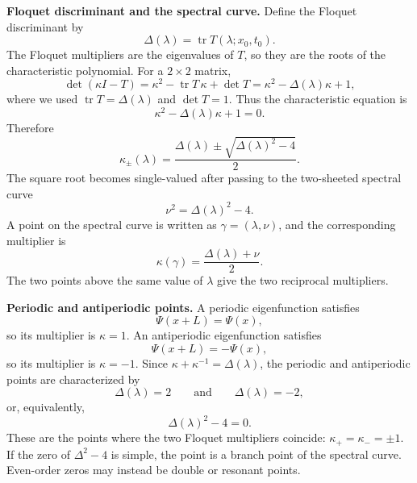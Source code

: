 \documentclass{amsart}
\newcounter{note}
\numberwithin{equation}{hw}
\newcommand{\noteheading}[1]{\vspace{1em}\noindent\textbf{#1}}
\begin{document}
\noteheading{Floquet discriminant and the spectral curve.}
Define the Floquet discriminant by
\begin{equation}
\Delta(\lambda)=\operatorname{tr}T(\lambda;x_0,t_0).
\label{eq:note2-floquet-discriminant}
\end{equation}
The Floquet multipliers are the eigenvalues of \(T\), so they are the
roots of the characteristic polynomial.  For a \(2\times2\) matrix,
\[
\det(\kappa I-T)
=
\kappa^2-\operatorname{tr}T\,\kappa+\det T
=
\kappa^2-\Delta(\lambda)\kappa+1,
\]
where we used \(\operatorname{tr}T=\Delta(\lambda)\) and \(\det T=1\).
Thus the characteristic equation is
\begin{equation}
\kappa^2-\Delta(\lambda)\kappa+1=0.
\label{eq:note2-characteristic-equation}
\end{equation}
Therefore
\begin{equation}
\kappa_\pm(\lambda)
=
\frac{
\Delta(\lambda)
\pm
\sqrt{\Delta(\lambda)^2-4}
}{2}.
\label{eq:note2-kappa-pm}
\end{equation}
The square root becomes single-valued after passing to the two-sheeted
spectral curve
\begin{equation}
\nu^2=\Delta(\lambda)^2-4.
\label{eq:note2-spectral-curve}
\end{equation}
A point on the spectral curve is written as
\(\gamma=(\lambda,\nu)\), and the corresponding multiplier is
\begin{equation}
\kappa(\gamma)
=
\frac{\Delta(\lambda)+\nu}{2}.
\label{eq:note2-kappa-on-curve}
\end{equation}
The two points above the same value of \(\lambda\) give the two
reciprocal multipliers.

\noteheading{Periodic and antiperiodic points.}
A periodic eigenfunction satisfies
\begin{equation}
\Psi(x+L)=\Psi(x),
\label{eq:note2-periodic-eigenfunction}
\end{equation}
so its multiplier is \(\kappa=1\).  An antiperiodic eigenfunction
satisfies
\begin{equation}
\Psi(x+L)=-\Psi(x),
\label{eq:note2-antiperiodic-eigenfunction}
\end{equation}
so its multiplier is \(\kappa=-1\).  Since
\(\kappa+\kappa^{-1}=\Delta(\lambda)\), the periodic and antiperiodic
points are characterized by
\begin{equation}
\Delta(\lambda)=2
\qquad\text{and}\qquad
\Delta(\lambda)=-2,
\label{eq:note2-periodic-antiperiodic-discriminant}
\end{equation}
or, equivalently,
\begin{equation}
\Delta(\lambda)^2-4=0.
\label{eq:note2-branch-double-condition}
\end{equation}
These are the points where the two Floquet multipliers coincide:
\(\kappa_+=\kappa_-=\pm1\).  If the zero of
\(\Delta^2-4\) is simple, the point is a branch point of the spectral
curve.  Even-order zeros may instead be double or resonant points.
\end{document}
